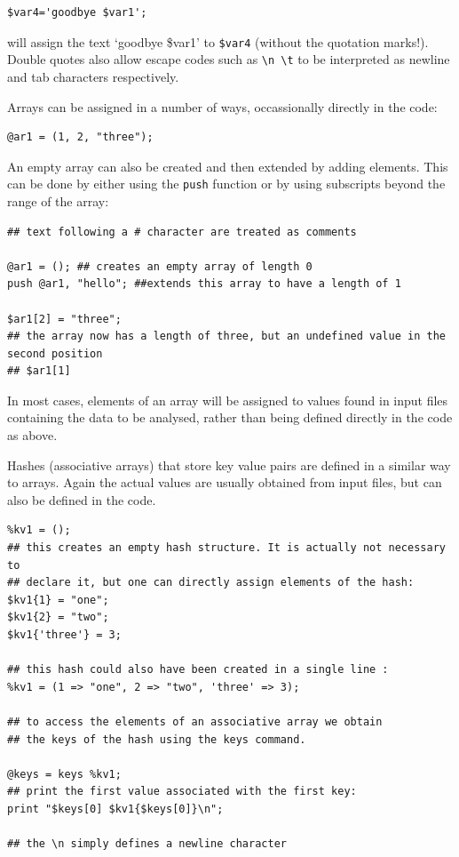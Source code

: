 \documentclass[11pt]{article}
\begin{document}
\begin{verbatim}
$var4='goodbye $var1';
\end{verbatim}

will assign the text `goodbye \$var1' to \texttt{\$var4} (without the quotation
marks!).
Double quotes also allow escape codes such as \texttt{\textbackslash{}n \textbackslash{}t} to be interpreted
as newline and tab characters respectively.

Arrays can be assigned in a number of ways, occassionally directly in
the code:


\begin{verbatim}
@ar1 = (1, 2, "three");
\end{verbatim}

An empty array can also be created and then extended by adding elements.
This can be done by either using the \texttt{push} function or by using
subscripts beyond the range of the array:


\begin{verbatim}
## text following a # character are treated as comments

@ar1 = (); ## creates an empty array of length 0 
push @ar1, "hello"; ##extends this array to have a length of 1

$ar1[2] = "three"; 
## the array now has a length of three, but an undefined value in the second position 
## $ar1[1]
\end{verbatim}

In most cases, elements of an array will be assigned to values found in
input files containing the data to be analysed, rather than being
defined directly in the code as above.

Hashes (associative arrays) that store key value pairs are defined in a
similar way to arrays. Again the actual values are usually obtained from
input files, but can also be defined in the code.


\begin{verbatim}
%kv1 = ();
## this creates an empty hash structure. It is actually not necessary to
## declare it, but one can directly assign elements of the hash:
$kv1{1} = "one";
$kv1{2} = "two";
$kv1{'three'} = 3;

## this hash could also have been created in a single line :
%kv1 = (1 => "one", 2 => "two", 'three' => 3);

## to access the elements of an associative array we obtain
## the keys of the hash using the keys command.

@keys = keys %kv1;
## print the first value associated with the first key:
print "$keys[0] $kv1{$keys[0]}\n";

## the \n simply defines a newline character
\end{verbatim}
\end{document}
